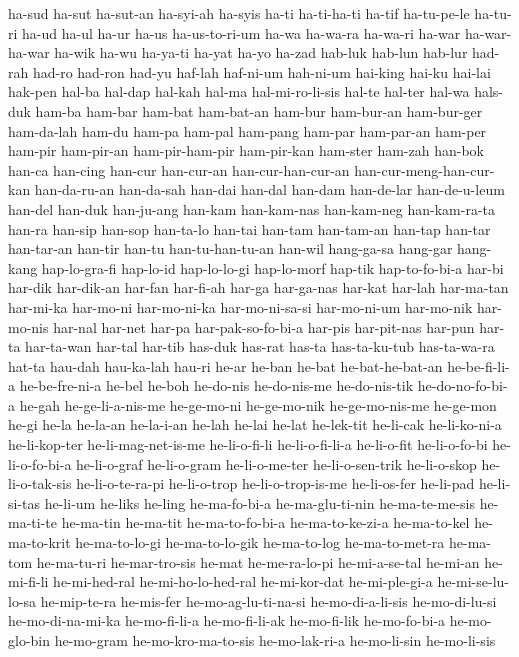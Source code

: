 {ha-sud ha-sut ha-sut-an ha-syi-ah ha-syis ha-ti ha-ti-ha-ti ha-tif
ha-tu-pe-le ha-tu-ri ha-ud ha-ul ha-ur ha-us ha-us-to-ri-um ha-wa ha-wa-ra
ha-wa-ri ha-war ha-war-ha-war ha-wik ha-wu ha-ya-ti ha-yat ha-yo ha-zad
hab-luk hab-lun hab-lur had-rah had-ro had-ron had-yu haf-lah haf-ni-um
hah-ni-um hai-king hai-ku hai-lai hak-pen hal-ba hal-dap hal-kah hal-ma
hal-mi-ro-li-sis hal-te hal-ter hal-wa hals-duk ham-ba ham-bar ham-bat
ham-bat-an ham-bur ham-bur-an ham-bur-ger ham-da-lah ham-du ham-pa ham-pal
ham-pang ham-par ham-par-an ham-per ham-pir ham-pir-an ham-pir-ham-pir
ham-pir-kan ham-ster ham-zah han-bok han-ca han-cing han-cur han-cur-an
han-cur-han-cur-an han-cur-meng-han-cur-kan han-da-ru-an han-da-sah
han-dai han-dal han-dam han-de-lar han-de-u-leum han-del han-duk
han-ju-ang han-kam han-kam-nas han-kam-neg han-kam-ra-ta han-ra han-sip
han-sop han-ta-lo han-tai han-tam han-tam-an han-tap han-tar han-tar-an
han-tir han-tu han-tu-han-tu-an han-wil hang-ga-sa hang-gar hang-kang
hap-lo-gra-fi hap-lo-id hap-lo-lo-gi hap-lo-morf hap-tik hap-to-fo-bi-a
har-bi har-dik har-dik-an har-fan har-fi-ah har-ga har-ga-nas har-kat
har-lah har-ma-tan har-mi-ka har-mo-ni har-mo-ni-ka har-mo-ni-sa-si
har-mo-ni-um har-mo-nik har-mo-nis har-nal har-net har-pa
har-pak-so-fo-bi-a har-pis har-pit-nas har-pun har-ta har-ta-wan har-tal
har-tib has-duk has-rat has-ta has-ta-ku-tub has-ta-wa-ra hat-ta hau-dah
hau-ka-lah hau-ri he-ar he-ban he-bat he-bat-he-bat-an he-be-fi-li-a
he-be-fre-ni-a he-bel he-boh he-do-nis he-do-nis-me he-do-nis-tik
he-do-no-fo-bi-a he-gah he-ge-li-a-nis-me he-ge-mo-ni he-ge-mo-nik
he-ge-mo-nis-me he-ge-mon he-gi he-la he-la-an he-la-i-an he-lah he-lai
he-lat he-lek-tit he-li-cak he-li-ko-ni-a he-li-kop-ter
he-li-mag-net-is-me he-li-o-fi-li he-li-o-fi-li-a he-li-o-fit
he-li-o-fo-bi he-li-o-fo-bi-a he-li-o-graf he-li-o-gram he-li-o-me-ter
he-li-o-sen-trik he-li-o-skop he-li-o-tak-sis he-li-o-te-ra-pi
he-li-o-trop he-li-o-trop-is-me he-li-os-fer he-li-pad he-li-si-tas
he-li-um he-liks he-ling he-ma-fo-bi-a he-ma-glu-ti-nin he-ma-te-me-sis
he-ma-ti-te he-ma-tin he-ma-tit he-ma-to-fo-bi-a he-ma-to-ke-zi-a
he-ma-to-kel he-ma-to-krit he-ma-to-lo-gi he-ma-to-lo-gik he-ma-to-log
he-ma-to-met-ra he-ma-tom he-ma-tu-ri he-mar-tro-sis he-mat he-me-ra-lo-pi
he-mi-a-se-tal he-mi-an he-mi-fi-li he-mi-hed-ral he-mi-ho-lo-hed-ral
he-mi-kor-dat he-mi-ple-gi-a he-mi-se-lu-lo-sa he-mip-te-ra he-mis-fer
he-mo-ag-lu-ti-na-si he-mo-di-a-li-sis he-mo-di-lu-si he-mo-di-na-mi-ka
he-mo-fi-li-a he-mo-fi-li-ak he-mo-fi-lik he-mo-fo-bi-a he-mo-glo-bin
he-mo-gram he-mo-kro-ma-to-sis he-mo-lak-ri-a he-mo-li-sin he-mo-li-sis
}
